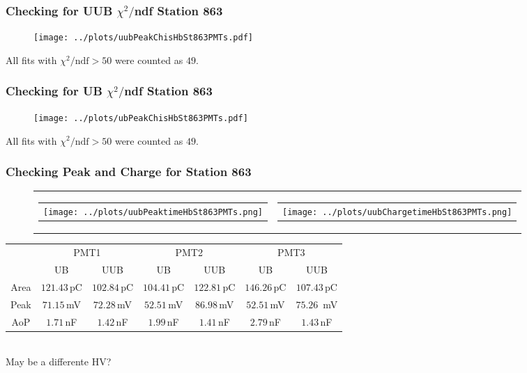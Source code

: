 \documentclass[aspectratio=169]{beamer}
\begin{document}
\begin{frame}
  \frametitle{Checking for UUB {\huge $\chi^2/$ndf} Station 863}
  \begin{figure}
    \centering
    \texttt{[image: ../plots/uubPeakChisHbSt863PMTs.pdf]}
  \end{figure}
  \footnotesize
  All fits with $\chi^2/\mathrm{ndf} > 50$ were counted as $49$.
\end{frame}

\begin{frame}
  \frametitle{Checking for UB {\huge $\chi^2/$ndf} Station 863}
  \begin{figure}
    \centering
    \texttt{[image: ../plots/ubPeakChisHbSt863PMTs.pdf]}
  \end{figure}
  \footnotesize
  All fits with $\chi^2/\mathrm{ndf} > 50$ were counted as $49$.
\end{frame}

\begin{frame}
  \frametitle{Checking Peak and Charge for Station 863}
  \begin{figure}
    \centering
    \begin{tabularx}{\textwidth}{CC}
      \begin{tabular}{l}
        \texttt{[image: ../plots/uubPeaktimeHbSt863PMTs.png]}
      \end{tabular}
      &
      \begin{tabular}{l}
        \texttt{[image: ../plots/uubChargetimeHbSt863PMTs.png]}
      \end{tabular}
      \\
    \end{tabularx}
  \end{figure}

  \begin{center}
    \small
    \begin{tabular}{|c|c|c|c|c|c|c|}
      \hline
      \multirow{2}{*}{} & \multicolumn{2}{c|}{PMT1} & \multicolumn{2}{c|}{PMT2} & \multicolumn{2}{c|}{PMT3} \\ \cline{2-7}
        & UB & UUB & UB & UUB & UB & UUB \\ \hline
      Area & $121.43$\,pC & $102.84$\,pC & $104.41$\,pC & $122.81$\,pC & $146.26$\,pC & $107.43$\,pC \\ \hline
      Peak & $71.15$\,mV  & $72.28$\,mV  & $52.51$\,mV  & $86.98$\,mV  & $52.51$\,mV  & $75.26$\, mV\\  \hline
      AoP  & $1.71$\,nF   & $1.42$\,nF   & $1.99$\,nF   & $1.41$\,nF   & $2.79$\,nF   & $1.43$\,nF \\ \hline
    \end{tabular}
    \\
    \vspace{0.5cm}
    May be a differente HV?
  \end{center}

\end{frame}
\end{document}
